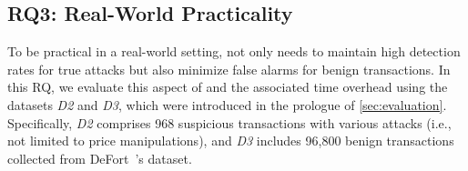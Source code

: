 
\subsection{RQ3: Real-World Practicality}
\label{sec:RQ3}


To be practical in a real-world setting, \name not only needs to maintain high detection rates for true attacks but also minimize false alarms for benign transactions.
In this RQ, we evaluate this aspect of \name and the associated time overhead using the datasets \textit{D2} and \textit{D3}, which were introduced in the prologue of \mysec\ref{sec:evaluation}.
Specifically, \textit{D2} comprises 968 suspicious transactions with various attacks (i.e., not limited to price manipulations), and \textit{D3} includes 96,800 benign transactions collected from DeFort~\cite{DeFort24}'s dataset. %

